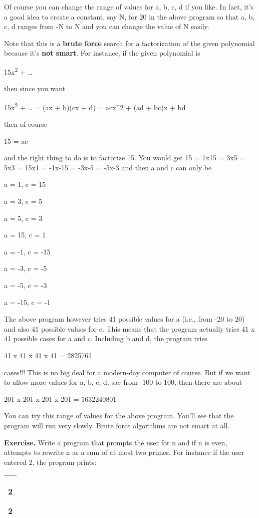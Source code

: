 \documentclass[
]{article}
\begin{document}
Of course you can change the range of values for a, b, c, d if you like.
In fact, it's a good idea to create a constant, say N, for 20 in the
above program so that a, b, c, d ranges from -N to N and you can change
the value of N easily.

Note that this is a \textbf{brute force} search for a factorization of
the given polynomial because it's \textbf{not smart}. For instance, if
the given polynomial is

15x\textsuperscript{2} + \ldots{}

then since you want

15x\textsuperscript{2} + \ldots{} = (ax + b)(cx + d) = acx\^{}2 + (ad +
bc)x + bd

then of course

15 = ac

and the right thing to do is to factorize 15. You would get 15 = 1x15 =
3x5 = 5x3 = 15x1 = -1x-15 = -3x-5 = -5x-3 and then a and c can only be

a = 1, c = 15

a = 3, c = 5

a = 5, c = 3

a = 15, c = 1

a = -1, c = -15

a = -3, c = -5

a = -5, c = -3

a = -15, c = -1

The above program however tries 41 possible values for a (i.e., from -20
to 20) and also 41 possible values for c. This means that the program
actually tries 41 x 41 possible cases for a and c. Including b and d,
the program tries

41 x 41 x 41 x 41 = 2825761

cases!!! This is no big deal for a modern-day computer of course. But if
we want to allow more values for a, b, c, d, say from -100 to 100, then
there are about

201 x 201 x 201 x 201 = 1632240801

You can try this range of values for the above program. You'll see that
the program will run very slowly. Brute force algorithms are not smart
at all.

\textbf{Exercise.} Write a program that prompts the user for n and if n
is even, attempts to rewrite n as a sum of at most two primes. For
instance if the user entered 2, the program prints:

\begin{longtable}[]{@{}l@{}}
\toprule
\endhead
\begin{minipage}[t]{0.97\columnwidth}\raggedright
2

2\strut
\end{minipage}\tabularnewline
\bottomrule
\end{longtable}
\end{document}
